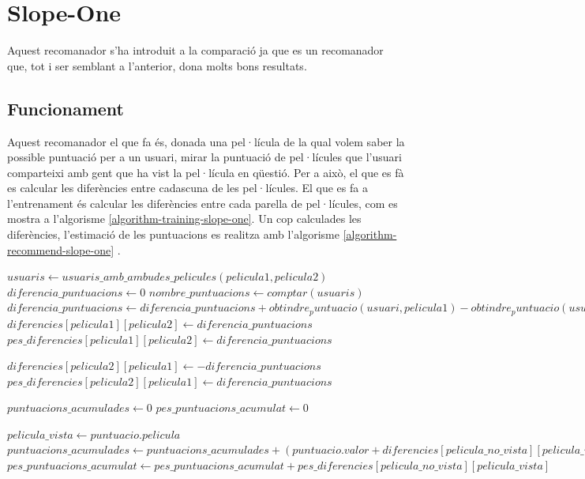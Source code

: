 \section{Slope-One}

Aquest recomanador s'ha introduit a la comparació ja que es un recomanador que, tot i ser semblant a l'anterior, dona molts bons resultats.

\subsection{Funcionament}

Aquest recomanador el que fa és, donada una pel·lícula de la qual volem saber la possible puntuació per a un usuari, mirar la puntuació de pel·lícules que l'usuari comparteixi amb gent que ha vist la pel·lícula en qüestió. Per a això, el que es fà es calcular les diferències entre cadascuna de les pel·lícules. El que es fa a l'entrenament és calcular les diferències entre cada parella de pel·lícules, com es mostra a l'algorisme \ref{algorithm-training-slope-one}. Un cop calculades les diferències, l'estimació de les puntuacions es realitza amb l'algorisme \ref{algorithm-recommend-slope-one} \cite{slope-one-wiki}.


\begin{algorithm}
\caption{Entrenament del Slope-One}
\label{algorithm-training-slope-one}
\begin{algorithmic}
\State $usuaris \gets usuaris\_amb\_ambudes\_pelicules(pelicula1, pelicula2)$
\State $diferencia\_puntuacions \gets 0$
\State $nombre\_puntuacions \gets comptar(usuaris)$
	\State $diferencia\_puntuacions \gets diferencia\_puntuacions + obtindre_puntuacio(usuari, pelicula1) - obtindre_puntuacio(usuari, pelicula2)$
\EndFor
\State $diferencies[pelicula1][pelicula2] \gets diferencia\_puntuacions$
\State $pes\_diferencies[pelicula1][pelicula2] \gets diferencia\_puntuacions$

\State $diferencies[pelicula2][pelicula1] \gets - diferencia\_puntuacions$
\State $pes\_diferencies[pelicula2][pelicula1] \gets diferencia\_puntuacions$
\end{algorithmic}
\end{algorithm}

\begin{algorithm}
\caption{Recomanació del Slope-One}
\label{algorithm-recommend-slope-one}
\begin{algorithmic}
\State $puntuacions\_acumulades \gets 0$
\State $pes\_puntuacions\_acumulat \gets 0$

	\State $pelicula\_vista \gets puntuacio.pelicula$
	\State $puntuacions\_acumulades \gets puntuacions\_acumulades + (puntuacio.valor + diferencies[pelicula\_no\_vista][pelicula\_vista]) \times pes\_diferencies[pelicula\_no\_vista][pelicula\_vista]$
	\State $pes\_puntuacions\_acumulat \gets pes\_puntuacions\_acumulat + pes\_diferencies[pelicula\_no\_vista][pelicula\_vista]$
\EndFor


\end{algorithmic}
\end{algorithm}

